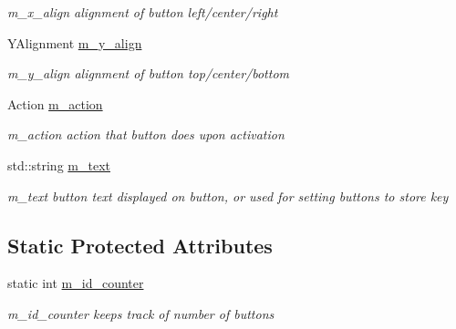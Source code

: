 \begin{DoxyCompactItemize}
\begin{DoxyCompactList}\small\item\em m\+\_\+x\+\_\+align alignment of button left/center/right \end{DoxyCompactList}\item 
\hypertarget{class_button_a8bd3166ddceefaed2c73e1d559213b6b}{}Y\+Alignment \hyperlink{class_button_a8bd3166ddceefaed2c73e1d559213b6b}{m\+\_\+y\+\_\+align}\label{class_button_a8bd3166ddceefaed2c73e1d559213b6b}

\begin{DoxyCompactList}\small\item\em m\+\_\+y\+\_\+align alignment of button top/center/bottom \end{DoxyCompactList}\item 
\hypertarget{class_button_a70ace223d5a3510f893625434963cd67}{}Action \hyperlink{class_button_a70ace223d5a3510f893625434963cd67}{m\+\_\+action}\label{class_button_a70ace223d5a3510f893625434963cd67}

\begin{DoxyCompactList}\small\item\em m\+\_\+action action that button does upon activation \end{DoxyCompactList}\item 
\hypertarget{class_button_a06388dbd60485e80ad8e856057f13489}{}std\+::string \hyperlink{class_button_a06388dbd60485e80ad8e856057f13489}{m\+\_\+text}\label{class_button_a06388dbd60485e80ad8e856057f13489}

\begin{DoxyCompactList}\small\item\em m\+\_\+text button text displayed on button, or used for setting buttons to store key \end{DoxyCompactList}\end{DoxyCompactItemize}
\subsection*{Static Protected Attributes}
\begin{DoxyCompactItemize}
\item 
\hypertarget{class_button_a303c28c6a024ef6854ef3f32bacd5c0b}{}static int \hyperlink{class_button_a303c28c6a024ef6854ef3f32bacd5c0b}{m\+\_\+id\+\_\+counter}\label{class_button_a303c28c6a024ef6854ef3f32bacd5c0b}

\begin{DoxyCompactList}\small\item\em m\+\_\+id\+\_\+counter keeps track of number of buttons \end{DoxyCompactList}\end{DoxyCompactItemize}


